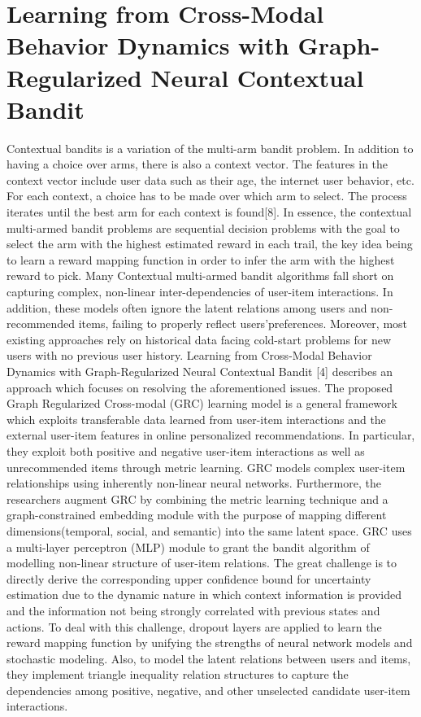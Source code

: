 \section {Learning from Cross-Modal Behavior Dynamics with
Graph-Regularized Neural Contextual Bandit}

Contextual bandits is a variation of the multi-arm bandit problem. In addition to having a choice over arms, there is also a context vector. The features in the context vector include user data such as their age, the internet user behavior, etc. For each context, a choice has to be made over which arm to select. The process iterates until the best arm for each context is found[8]. In essence, the contextual multi-armed bandit problems are sequential decision problems with the goal to select the arm with the highest estimated reward in each trail, the key idea being to learn a reward mapping function in order to infer the arm with the highest reward to pick. Many Contextual multi-armed bandit algorithms fall short on capturing complex, non-linear inter-dependencies of user-item interactions. In addition, these models often ignore the latent relations among users and non-recommended items, failing to properly reflect users’preferences. Moreover, most existing approaches rely on historical data facing cold-start problems for new users with no previous user history. Learning from Cross-Modal Behavior Dynamics with Graph-Regularized Neural Contextual Bandit [4] describes an approach which focuses on resolving the aforementioned issues. The proposed Graph Regularized Cross-modal (GRC) learning model is a general framework which exploits transferable data learned from user-item interactions and the external user-item features in online personalized recommendations. In particular, they exploit both positive and negative user-item interactions as well as unrecommended items through metric learning. GRC models complex user-item relationships using inherently non-linear neural networks. Furthermore, the researchers augment GRC by combining the metric learning technique and a graph-constrained embedding module with the purpose of mapping different dimensions(temporal, social, and semantic) into the same latent space. GRC uses a multi-layer perceptron (MLP) module to grant the bandit algorithm of modelling non-linear structure of user-item relations. The great challenge is to directly derive the corresponding upper confidence bound for uncertainty estimation due to the dynamic nature in which context information is provided and the information not being strongly correlated with previous states and actions. To deal with this challenge, dropout layers are applied to learn the reward mapping function by unifying the strengths of neural network models and stochastic modeling. Also, to model the latent relations between users and items, they implement triangle inequality relation structures to capture the dependencies among positive, negative, and other unselected candidate user-item interactions. 
